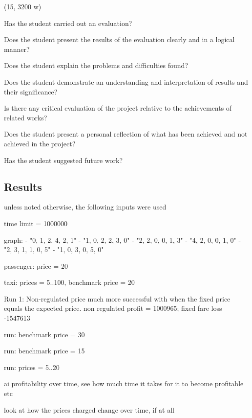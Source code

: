 (15, 3200 w)

Has the student carried out an evaluation?

Does the student present the results of the evaluation clearly and in a logical
manner?

Does the student explain the problems and difficulties found?

Does the student demonstrate an understanding and interpretation of results and
their significance?

Is there any critical evaluation of the project relative to the achievements of
related works?

Does the student present a personal reflection of what has been achieved and
not achieved in the project?

Has the student suggested future work?


\subsection{Results}
unless noted otherwise, the following inputs were used
 
time limit = 1000000

graph:
  - "0, 1, 2, 4, 2, 1"
  - "1, 0, 2, 2, 3, 0"
  - "2, 2, 0, 0, 1, 3"
  - "4, 2, 0, 0, 1, 0"
  - "2, 3, 1, 1, 0, 5"
  - "1, 0, 3, 0, 5, 0"

passenger: price = 20

taxi: prices = 5..100, benchmark price = 20

Run 1: Non-regulated price much more successful with when the fixed price
equals the expected price. non regulated profit = 1000965; fixed fare loss
-1547613


run: benchmark price = 30

run: benchmark price = 15

run: prices = 5..20





ai profitability over time, see how much time it takes for it to become
profitable etc

look at how the prices charged change over time, if at all
